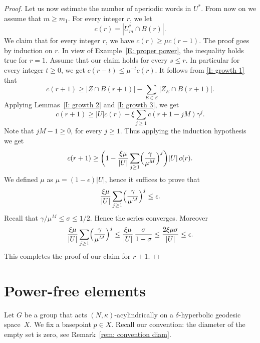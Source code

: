 \begin{proof}
Let us now estimate the number of aperiodic words in $U^*$.
From now on we assume that $m \geq m_1$.
For every integer $r$, we let
\begin{equation*}
c(r) = | U^*_m \cap B(r)|.
\end{equation*}
We claim that for every integer $r$, we have $c(r) \geq \mu c(r-1)$.
The proof goes by induction on $r$.
In view of Example~\ref{E: proper power}, the inequality holds true for $r = 1$.
Assume that our claim holds for every $s \leq r$.
In particular for every integer $t \geq 0$, we get $c(r -t) \leq \mu^{-t}c(r)$.
It follows from \eqref{I: growth 1} that
\begin{equation*}
c(r+1) \geq | Z \cap B(r+1)| - \sum_{E \in \mathcal E} |Z_E\cap B(r+1)|.
\end{equation*}
Applying Lemmas~\ref{I: growth 2} and \ref{I: growth 3}, we get
\begin{equation*}
c(r+1) \geq |U| c(r) - \xi
\sum_{j\geqslant 1} c(r+1 -jM)\gamma^j.
\end{equation*}
Note that $jM - 1 \geq 0$, for every $j \geq 1$.
Thus applying the induction hypothesis we get
\begin{equation*}
c(r+1)
\geq \biggl( 1 -\frac {\xi\mu} {|U|}\sum_{j \geq 1} \Bigl(\frac{\gamma}{\mu^M}\Bigr)^j\biggr) |U|\, c(r).
\end{equation*}
We defined $\mu$ as $\mu = (1 - \epsilon)|U|$, hence it suffices to prove that
\begin{equation*}
\frac {\xi\mu} {|U|}\sum_{j \geq 1} \Bigl(\frac{\gamma}{\mu^M}\Bigr)^j \leq \epsilon.
\end{equation*}
Recall that $\gamma/\mu^M \leq \sigma \leq 1/2$.
Hence the series converges.
Moreover
\begin{equation*}
\frac {\xi\mu} {|U|}\sum_{j \geq 1} \Bigl(\frac{\gamma}{\mu^M}\Bigr)^j
\leq \frac {\xi\mu} {|U|}\, \frac {\sigma}{1 - \sigma}
\leq \frac {2\xi\mu\sigma} {|U|}
\leq \epsilon.
\end{equation*}
This completes the proof of our claim for $r+1$.
\end{proof}

\section{Power-free elements}
\label{sec: power-free elements}

Let $G$ be a group that acts $(N,\kappa)$-acylindrically on a $\delta$-hyperbolic geodesic space~$X$.
We fix a basepoint $p \in X$.
Recall our convention: the diameter of the empty set is zero, see Remark~\ref{rem: convention diam}.

